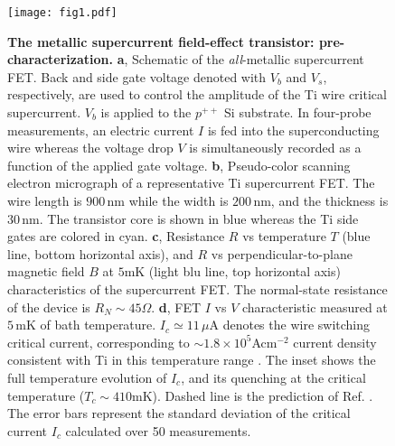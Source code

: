 \documentclass[prl,twocolumn,reprint,graphicx,showpacs,superscriptaddress,floatfix]{revtex4-1}
\begin{document}
\begin{figure}[t!]
\begin{center}
\texttt{[image: fig1.pdf]}\vspace{-3mm}
\caption{\textbf{The metallic supercurrent field-effect transistor: pre-characterization.} 
\textbf{a}, Schematic of the \emph{all}-metallic supercurrent FET. 
Back and side gate voltage denoted with $V_b$ and $V_s$, respectively, are used to control the amplitude of the Ti wire critical supercurrent. $V_b$ is applied to the $p^{++}$ Si substrate.
In four-probe measurements, an electric current $I$ is fed into the superconducting wire whereas the voltage drop $V$ is simultaneously recorded as a function of the applied gate voltage. 
\textbf{b}, Pseudo-color scanning electron micrograph of a representative Ti supercurrent FET. 
The wire length is $900\,$nm while the width is $200\,$nm, and the thickness is $30\,$nm. 
The transistor core is shown in blue whereas the Ti side gates are colored in cyan. 
\textbf{c}, Resistance $R$ vs temperature $T$ (blue line, bottom horizontal axis), and $R$ vs perpendicular-to-plane magnetic field $B$ at $5$mK (light blu line, top horizontal axis) characteristics of the supercurrent FET. The normal-state resistance of the device is $R_N\sim 45\Omega$.
\textbf{d}, FET $I$ vs $V$ characteristic measured at $5\,$mK of bath temperature. 
$I_c\simeq 11\,\mu$A denotes the wire switching critical current, corresponding to $\sim 1.8 \times 10^5$Acm$^{-2}$ current density consistent with Ti in this temperature range \cite{Bardeen1962}.
The inset shows the full temperature evolution of $I_c$, and its quenching at the critical temperature ($T_c \sim 410$mK). Dashed line is the prediction of Ref. \cite{Bardeen1962}.   
The error bars represent the standard deviation of the critical current  $I_c$  calculated over 50 measurements.
}
\label{fig1}
\end{center}
\end{figure}
\end{document}
